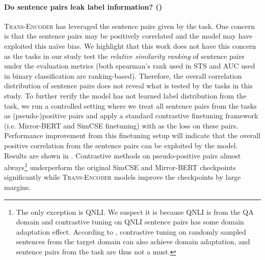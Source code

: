 \documentclass{article} \usepackage{iclr2021_conference,times}
\newcommand{\modelname}{\textsc{Trans-Encoder}\xspace}
\begin{document}
\paragraph{Do sentence pairs leak label information? ()} \modelname has leveraged the sentence pairs given by the task. One concern is that the sentence pairs may be positively correlated and the model may have exploited this na\"ive bias. We highlight that this work does not have this concern as the tasks in our study test the \textit{relative similarity ranking} of sentence pairs under the evaluation metrics (both spearman's rank used in STS and AUC used in binary classification are ranking-based). Therefore, the overall correlation distribution of sentence pairs does not reveal what is tested by the tasks in this study.
To further verify the model has not learned label distribution from the task, we run a controlled setting where we treat all sentence pairs from the tasks as (pseudo-)positive pairs and apply a standard contrastive finetuning framework (i.e. Mirror-BERT and SimCSE finetuning) with  as the loss on these pairs. Performance improvement from this finetuning setup will indicate that the overall positive correlation from the sentence pairs can be exploited by the model. Results are shown in . Contrastive methods on pseudo-positive pairs almost always\footnote{The only exception is QNLI. We suspect it is because QNLI is from the QA domain and contrastive tuning on QNLI sentence pairs has some domain adaptation effect. According to \citet{liu2021fast}, contrastive tuning on randomly sampled sentences from the target domain can also achieve domain adaptation, and sentence pairs from the task are thus not a must.} underperform the original SimCSE and Mirror-BERT checkpoints significantly while \modelname models improve the checkpoints by large margins.
\end{document}
